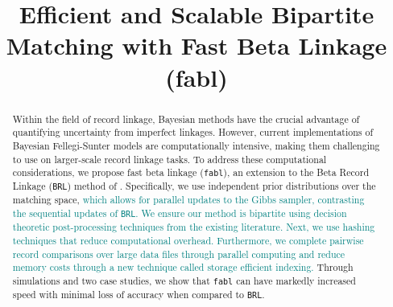 \documentclass[ba]{imsart}
\begin{document}
\linenumbers
\begin{frontmatter}
\title{Efficient and Scalable Bipartite Matching with Fast Beta Linkage  (fabl)}


\begin{abstract} 
Within the field of record linkage, Bayesian methods have the crucial advantage of quantifying uncertainty from imperfect linkages. However, current implementations of Bayesian Fellegi-Sunter models are computationally intensive, making them challenging to use on larger-scale record linkage tasks. To address these computational considerations, we propose fast beta linkage (\texttt{fabl}), an extension to the Beta Record Linkage (\texttt{BRL}) method of \cite{sadinle_bayesian_2017}. Specifically, we use independent prior distributions over the matching space, \textcolor{teal}{which allows for parallel updates to the Gibbs sampler, contrasting the sequential updates of \texttt{BRL}.}
\textcolor{teal}{We ensure our method is bipartite using decision theoretic post-processing techniques from the existing literature.}
\textcolor{teal}{Next, we use hashing techniques that reduce computational overhead. Furthermore, we complete pairwise record comparisons over large data files through parallel computing and reduce memory costs through a new technique called storage efficient indexing. 
}
Through simulations and two case studies, we show that \texttt{fabl} can have markedly increased speed with minimal loss of accuracy when compared to \texttt{BRL}.
\end{abstract}



\end{frontmatter}
\end{document}
